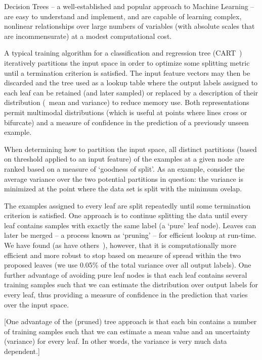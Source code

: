 Decision Trees -- a well-established and popular approach to Machine Learning -- are easy to understand and implement, and are capable of learning complex, nonlinear relationships over large numbers of variables (with absolute scales that are incommensurate) at a modest computational cost. 

A typical training algorithm for a classification and regression tree (CART~\cite{}) iteratively partitions the input space in order to optimize some splitting metric until a termination criterion is satisfied. The input feature vectors may then be discarded and the tree used as a lookup table where the output labels assigned to each leaf can be retained (and later sampled) or replaced by a description of their distribution (\eg~mean and variance) to reduce memory use. Both representations permit multimodal distributions (which is useful at points where lines cross or bifurcate) and a measure of confidence in the prediction of a previously unseen example.


When determining how to partition the input space, all distinct partitions (based on threshold applied to an input feature) of the examples at a given node are ranked based on a measure of `goodness of split'. As an example, consider the average variance over the two potential partitions in question: the variance is minimized at the point where the data set is split with the minimum ovelap.

The examples assigned to every leaf are split repeatedly until some termination criterion is satisfied. One approach is to continue splitting the data until every leaf contains samples with exactly the same label (a `pure' leaf node). Leaves can later be merged -- a process known as `pruning' -- for efficient lookup at run-time. We have found (as have others~\cite{Criminisi_MICCAI11}), however, that it is computationally more efficient and more robust to stop based on measure of spread within the two proposed leaves (we use 0.05\% of the total variance over all output labels). One further advantage of avoiding pure leaf nodes is that each leaf contains several training samples such that we can estimate the distribution over output labels for every leaf, thus providing a measure of confidence in the prediction that varies over the input space.


[One advantage of the (pruned) tree approach is that each bin contains a number of training samples such that we can estimate a mean value and an uncertainty (variance) for every leaf. In other words, the variance is very much data dependent.]